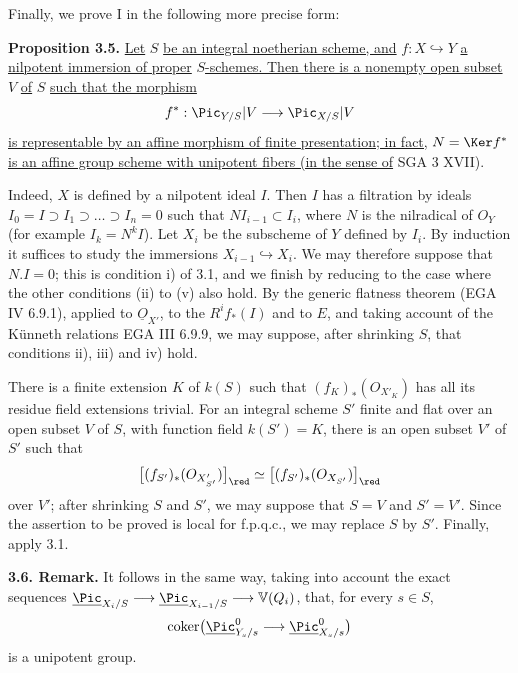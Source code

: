 Finally, we prove I in the following more precise form:

\textbf{Proposition 3.5.} \uline{Let} \(S\) \uline{be an integral noetherian scheme, and} \(f:X\hookrightarrow Y\) \uline{a nilpotent immersion of proper} \(S\)\uline{-schemes. Then there is a nonempty open subset} \(V\) \uline{of} \(S\) \uline{such that the morphism}
\[
  f^*:\Pic_{Y/S}|V\longrightarrow\Pic_{X/S}|V
\]
\uline{is representable by an affine morphism of finite presentation; in fact,} \(N=\Ker f^*\) \uline{is an affine group scheme with unipotent fibers (in the sense of} SGA 3 XVII).

Indeed, \(X\) is defined by a nilpotent ideal \(I\). Then \(I\) has a filtration by ideals \(I_0=I\supset I_1\supset\ldots\supset I_n=0\) such that \(NI_{i-1}\subset I_i\), where \(N\) is the nilradical of \({O}_Y\) (for example \(I_k=N^kI\)). Let \(X_i\) be the subscheme of \(Y\) defined by \(I_i\). By induction it suffices to study the immersions \(X_{i-1}\hookrightarrow X_i\). We may therefore suppose that \(N.I=0\); this is condition i) of 3.1, and we finish by reducing to the case where the other conditions (ii) to (v) also hold. By the generic flatness theorem (EGA IV 6.9.1), applied to \(\underline{O}_{X'}\), to the \(R^if_*(I)\) and to \(E\), and taking account of the Künneth relations EGA III 6.9.9, we may suppose, after shrinking \(S\), that conditions ii), iii) and iv) hold.


%
There is a finite extension \(K\) of \(k(S)\) such that \((f_K)_*({O}_{X'_K})\) has all its residue field extensions trivial. For an integral scheme \(S'\) finite and flat over an open subset \(V\) of \(S\), with function field \(k(S')=K\), there is an open subset \(V'\) of \(S'\) such that
\[
  \bigl[(f_{S'})_*({O}_{X'_{S'}})\bigr]_{\red}
  \simeq
  \bigl[(f_{S'})_*({O}_{X_{S'}})\bigr]_{\red}
\]
over \(V'\); after shrinking \(S\) and \(S'\), we may suppose that \(S=V\) and \(S'=V'\). Since the assertion to be proved is local for f.p.q.c., we may replace \(S\) by \(S'\). Finally, apply 3.1.

\textbf{3.6. Remark.} It follows in the same way, taking into account the exact sequences \(\underline{\Pic}_{X_i/S}\longrightarrow\underline{\Pic}_{X_{i-1}/S}\longrightarrow\mathbb V(Q_i)\), that, for every \(s\in S\),
\[
  \operatorname{coker}\bigl(\underline{\Pic}^0_{Y_s/s}\longrightarrow\underline{\Pic}^0_{X_s/s}\bigr)
\]
is a unipotent group.

